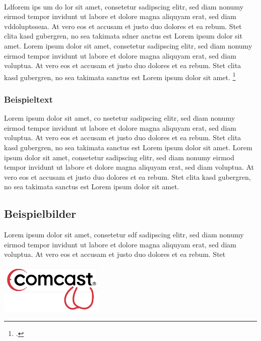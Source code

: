  \\
Ldforem ips um do lor sit amet, consetetur sadipscing elitr, \label{Referenz}
sed diam  nonumy eirmod tempor invidunt ut labore et dolore magna aliquyam erat,
sed diam vddoluptsssua. At vero eos et accusam et justo duo dolores et ea rebum.
Stet clita kasd gubergren, no sea takimata sdner anctus est Lorem ipsum dolor sit amet. Lorem ipsum dolor sit amet, consetetur sadipscing elitr, sed diam nonumy eirmod tempor invidunt ut labore et dolore magna aliquyam erat, sed diam voluptua. At vero eos et accusam et justo duo dolores et ea rebum. Stet clita kasd gubergren, no sea takimata sanctus est Lorem ipsum dolor sit amet.
\footcite[Vgl.][Experto.de, Artikel über das und jenes]{praxishandbuch:bpmn2}
\subsubsection{Beispieltext}
Lorem ipsum dolor sit amet, co nsetetur sadipscing elitr, sed diam
nonumy eirmod tempor invidunt ut labore et dolore magna aliquyam erat, sed diam voluptua. At vero eos et accusam et justo duo dolores et ea rebum. Stet clita kasd gubergren, no sea takimata sanctus est Lorem ipsum dolor sit amet. Lorem ipsum dolor sit amet, consetetur sadipscing elitr, sed diam nonumy eirmod tempor invidunt ut labore et dolore magna aliquyam erat, sed diam voluptua. At vero eos et accusam et justo duo dolores et ea rebum. Stet clita kasd gubergren, no sea takimata sanctus est Lorem ipsum dolor sit amet.

\clearpage

\subsection{Beispielbilder}
Lorem ipsum dolor sit amet, consetetur  sdf sadipscing elitr, sed diam nonumy eirmod tempor invidunt ut labore et dolore magna aliquyam erat, sed diam voluptua. At vero eos et accusam et justo duo dolores et ea rebum. Stet

\begin{center}
	\includegraphics[width=5cm]{images/company_logo.png}
\end{center}

